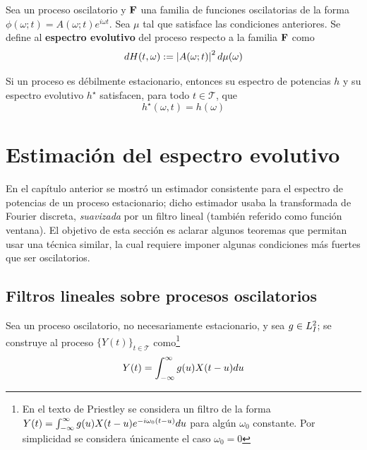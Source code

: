 \begin{definicion}
Sea \xt un proceso oscilatorio y $\mathbf{F}$ una familia de funciones oscilatorias de la forma
$\phi(\omega;t) = A(\omega;t) e^{i \omega t}$. 
Sea $\mu$ tal que satisface las condiciones anteriores.
Se define al \textbf{espectro evolutivo} del proceso respecto a la familia $\mathbf{F}$ como
\begin{equation}
dH(t,\omega) := \left| A(\omega;t) \right|^{2} d\mu(\omega)
\end{equation}
\label{def:oscilatorio}
\end{definicion}

\begin{proposicion}
Si un proceso \xt es débilmente estacionario, entonces su espectro de potencias $h$ y su espectro evolutivo $h^{\star}$ satisfacen, para todo $t\in \mathcal{T}$, que
\begin{equation}
h^{\star}(\omega, t) = h(\omega)
\end{equation}
\end{proposicion}


\section{Estimación del espectro evolutivo}
\label{sec:estimacion}

En el capítulo anterior se mostró un estimador consistente para el espectro de potencias de un proceso estacionario; dicho estimador usaba la transformada de Fourier discreta, \textit{suavizada} por un filtro lineal (también referido como función ventana).
%
El objetivo de esta sección es aclarar algunos teoremas que permitan usar una técnica similar, la cual requiere imponer algunas condiciones más fuertes que ser oscilatorios.

\subsection{Filtros lineales sobre procesos oscilatorios}

Sea \xt un proceso oscilatorio, no necesariamente estacionario, y sea $g\in L^{2}_I$; se construye al proceso $\{Y(t)\}_{t\in \mathcal{T}}$ como\footnote{En el texto de Priestley se considera un filtro de la forma $Y(t) = \int_{-\infty}^{\infty} g(u) X(t-u) e^{-i \omega_0 (t-u)} du$ para algún $\omega_0$ constante. 
Por simplicidad se considera únicamente el caso $\omega_0=0$}
\begin{equation}
Y(t) = \int_{-\infty}^{\infty} g(u) X(t-u) du
\end{equation}

